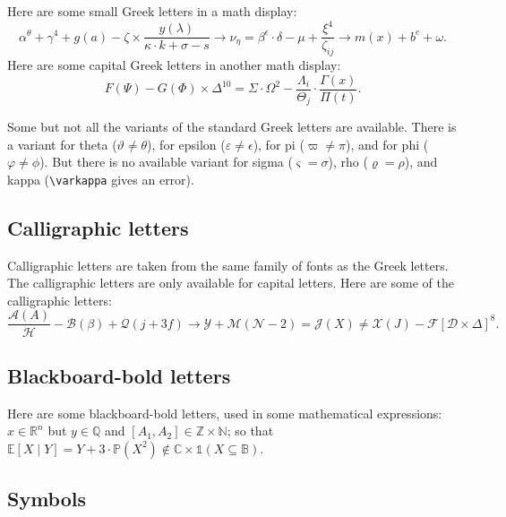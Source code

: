 \documentclass[letterpaper,11pt,leqno]{article}
\begin{document}
Here are some small Greek letters in a math display: 
\begin{equation*}
\alpha^{\theta} + \gamma^4 + g(a) - \zeta \times \frac{y(\lambda)}{\kappa \cdot k+ \sigma - s} \to \nu_{\eta} = \beta^\epsilon \cdot \delta - \mu + \frac{\xi^4}{\zeta_{ij}} \to m(x) + b^e + \omega .
\end{equation*}
Here are some capital Greek letters in another math display: 
\begin{equation}
F(\Psi) - G(\Phi) \times \Delta^{10} = \Sigma \cdot \Omega^2 - \frac{\Lambda_i}{\Theta_j} \cdot \frac{\Gamma(x)}{\Pi(t)}.
\label{e:capitalgreek}\end{equation}

Some but not all the variants of the standard Greek letters are available. There is a variant for theta ($\vartheta \neq \theta$), for epsilon ($\varepsilon \neq \epsilon$), for pi ($\varpi \neq \pi$), and for phi ($\varphi \neq \phi$). But there is no available variant for sigma ($\varsigma = \sigma$), rho ($\varrho = \rho$), and kappa (\texttt{\textbackslash varkappa} gives an error).

\subsection{Calligraphic letters} 

Calligraphic letters are taken from the same family of fonts as the Greek letters. The calligraphic letters are only available for capital letters. Here are some of the calligraphic letters: 
\begin{equation*}
\frac{\mathcal{A}(A)}{\mathcal{H}} - \mathcal{B}(\beta) + \mathcal{Q}(j+3f) \to \mathcal{Y} + \mathcal{M}(\mathcal{N} - 2) = \mathcal{J}(X) \neq \mathcal{X}(J) - \mathcal{F}[\mathcal{D} \times \Delta]^8. 
\end{equation*}

\subsection{Blackboard-bold letters} 

Here are some blackboard-bold letters, used in some mathematical expressions: $x \in\mathbb{R}^n$ but $y\in \mathbb{Q}$ and $[A_1,A_2] \in \mathbb{Z} \times \mathbb{N}$; so that $\mathbb{E}[X\mid Y] = Y + 3 \cdot \mathbb{P}(X^2) \notin \mathbb{C} \times \mathbb{1}(X \subseteq \mathbb{B})$.

\subsection{Symbols} 
\end{document}
